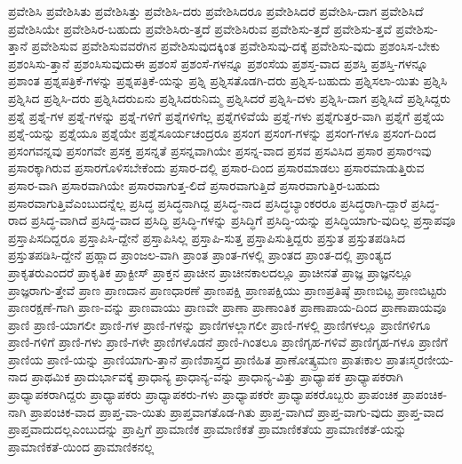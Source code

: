 {ಪ್ರವೇಶಿಸಿ
ಪ್ರವೇಶಿಸಿತು
ಪ್ರವೇಶಿಸಿತ್ತು
ಪ್ರವೇಶಿಸಿ-ದರು
ಪ್ರವೇಶಿಸಿದರೂ
ಪ್ರವೇಶಿಸಿದರೆ
ಪ್ರವೇಶಿಸಿ-ದಾಗ
ಪ್ರವೇಶಿಸಿದೆ
ಪ್ರವೇಶಿಸಿಯೇ
ಪ್ರವೇಶಿಸಿರ-ಬಹುದು
ಪ್ರವೇಶಿಸಿರು-ತ್ತದೆ
ಪ್ರವೇಶಿಸಿರುವ
ಪ್ರವೇಶಿಸು-ತ್ತದೆ
ಪ್ರವೇಶಿಸು-ತ್ತವೆ
ಪ್ರವೇಶಿಸು-ತ್ತಾನೆ
ಪ್ರವೇಶಿಸುವ
ಪ್ರವೇಶಿಸುವವರೆಗಿನ
ಪ್ರವೇಶಿಸುವುದಕ್ಕಿಂತ
ಪ್ರವೇಶಿಸುವು-ದಕ್ಕೆ
ಪ್ರವೇಶಿಸು-ವುದು
ಪ್ರಶಂಸಿಸ-ಬೇಕು
ಪ್ರಶಂಸಿಸು-ತ್ತಾನೆ
ಪ್ರಶಂಸಿಸುವುದುಈ
ಪ್ರಶಂಸೆ
ಪ್ರಶಂಸೆ-ಗಳನ್ನೂ
ಪ್ರಶಂಸೆಯ
ಪ್ರಶಸ್ತ-ವಾದ
ಪ್ರಶಸ್ತಿ
ಪ್ರಶಸ್ತಿ-ಗಳನ್ನೂ
ಪ್ರಶಾಂತ
ಪ್ರಶ್ನಪತ್ರಿಕೆ-ಗಳನ್ನು
ಪ್ರಶ್ನಪತ್ರಿಕೆ-ಯನ್ನು
ಪ್ರಶ್ನಿ
ಪ್ರಶ್ನಿಸತೊಡಗಿ-ದರು
ಪ್ರಶ್ನಿಸ-ಬಹುದು
ಪ್ರಶ್ನಿಸಲಾ-ಯಿತು
ಪ್ರಶ್ನಿಸಿ
ಪ್ರಶ್ನಿಸಿದ
ಪ್ರಶ್ನಿಸಿ-ದರು
ಪ್ರಶ್ನಿಸಿದರುಏನು
ಪ್ರಶ್ನಿಸಿದರುನಿಮ್ಮ
ಪ್ರಶ್ನಿಸಿದರೆ
ಪ್ರಶ್ನಿಸಿ-ದಳು
ಪ್ರಶ್ನಿಸಿ-ದಾಗ
ಪ್ರಶ್ನಿಸಿದೆ
ಪ್ರಶ್ನಿಸಿದ್ದರು
ಪ್ರಶ್ನೆ
ಪ್ರಶ್ನೆ-ಗಳ
ಪ್ರಶ್ನೆ-ಗಳನ್ನು
ಪ್ರಶ್ನೆ-ಗಳಿಗೆ
ಪ್ರಶ್ನೆಗಳಿಗೆಲ್ಲ
ಪ್ರಶ್ನೆಗಳಿವೆಯೆ
ಪ್ರಶ್ನೆ-ಗಳು
ಪ್ರಶ್ನೆಗುತ್ತರ-ವಾಗಿ
ಪ್ರಶ್ನೆಗೆ
ಪ್ರಶ್ನೆಯ
ಪ್ರಶ್ನೆ-ಯನ್ನು
ಪ್ರಶ್ನೆಯೂ
ಪ್ರಶ್ನೆಯೇ
ಪ್ರಶ್ನೆಸೂರ್ಯಚಂದ್ರರೂ
ಪ್ರಸಂಗ
ಪ್ರಸಂಗ-ಗಳನ್ನು
ಪ್ರಸಂಗ-ಗಳೂ
ಪ್ರಸಂಗ-ದಿಂದ
ಪ್ರಸಂಗವನ್ನವು
ಪ್ರಸಂಗವೇ
ಪ್ರಸಕ್ತ
ಪ್ರಸನ್ನತೆ
ಪ್ರಸನ್ನವಾಗಿಯೇ
ಪ್ರಸನ್ನ-ವಾದ
ಪ್ರಸವ
ಪ್ರಸವಿಸಿದ
ಪ್ರಸಾರ
ಪ್ರಸಾರಇವು
ಪ್ರಸಾರಕ್ಕಾಗಿರುವ
ಪ್ರಸಾರಗೊಳಿಸಬೇಕೆಂದು
ಪ್ರಸಾರ-ದಲ್ಲಿ
ಪ್ರಸಾರ-ದಿಂದ
ಪ್ರಸಾರಮಾಡಲು
ಪ್ರಸಾರಮಾಡುತ್ತಿರುವ
ಪ್ರಸಾರ-ವಾಗಿ
ಪ್ರಸಾರವಾಗಿಯೇ
ಪ್ರಸಾರವಾಗುತ್ತ-ಲಿದೆ
ಪ್ರಸಾರವಾಗುತ್ತಿದೆ
ಪ್ರಸಾರವಾಗುತ್ತಿರ-ಬಹುದು
ಪ್ರಸಾರವಾಗುತ್ತಿವೆಎಂಬುದನ್ನೆಲ್ಲ
ಪ್ರಸಿದ್ಧ
ಪ್ರಸಿದ್ಧನಾಗಿದ್ದ
ಪ್ರಸಿದ್ಧ-ನಾದ
ಪ್ರಸಿದ್ಧಬ್ಯಾಂಕರರೂ
ಪ್ರಸಿದ್ಧರಾಗಿ-ದ್ದಾರೆ
ಪ್ರಸಿದ್ಧ-ರಾದ
ಪ್ರಸಿದ್ಧ-ವಾಗಿದೆ
ಪ್ರಸಿದ್ಧ-ವಾದ
ಪ್ರಸಿದ್ಧಿ
ಪ್ರಸಿದ್ಧಿ-ಗಳನ್ನು
ಪ್ರಸಿದ್ಧಿಗೆ
ಪ್ರಸಿದ್ಧಿ-ಯನ್ನು
ಪ್ರಸಿದ್ಧಿಯಾಗು-ವುದಿಲ್ಲ
ಪ್ರಸ್ತಾಪವೂ
ಪ್ರಸ್ತಾಪಿಸದಿದ್ದರೂ
ಪ್ರಸ್ತಾಪಿಸಿ-ದ್ದೇನೆ
ಪ್ರಸ್ತಾಪಿಸಿಲ್ಲ
ಪ್ರಸ್ತಾಪಿ-ಸುತ್ತ
ಪ್ರಸ್ತಾಪಿಸುತ್ತಿದ್ದರು
ಪ್ರಸ್ತುತ
ಪ್ರಸ್ತುತಪಡಿಸಿದ
ಪ್ರಸ್ತುತಪಡಿಸಿ-ದ್ದೇನೆ
ಪ್ರಹ್ಲಾದ
ಪ್ರಾಂಜಲ-ವಾಗಿ
ಪ್ರಾಂತ
ಪ್ರಾಂತ-ಗಳಲ್ಲಿ
ಪ್ರಾಂತದ
ಪ್ರಾಂತ-ದಲ್ಲಿ
ಪ್ರಾಂತ್ಯದ
ಪ್ರಾಕೃತರುಎಂದರೆ
ಪ್ರಾಕೃತಿಕ
ಪ್ರಾಕ್ಟೀಸ್
ಪ್ರಾಕ್ತನ
ಪ್ರಾಚೀನ
ಪ್ರಾಚೀನಕಾಲದಲ್ಲೂ
ಪ್ರಾಚೀನತೆ
ಪ್ರಾಜ್ಞ
ಪ್ರಾಜ್ಞನಲ್ಲೂ
ಪ್ರಾಜ್ಞರಾಗು-ತ್ತೇವೆ
ಪ್ರಾಣ
ಪ್ರಾಣದಾನ
ಪ್ರಾಣಧಾರಣೆ
ಪ್ರಾಣಪಕ್ಷಿ
ಪ್ರಾಣಪಕ್ಷಿಯು
ಪ್ರಾಣಪ್ರತಿಷ್ಠೆ
ಪ್ರಾಣಬಿಟ್ಟ
ಪ್ರಾಣಬಿಟ್ಟರು
ಪ್ರಾಣರಕ್ಷಣೆ-ಗಾಗಿ
ಪ್ರಾಣ-ವನ್ನು
ಪ್ರಾಣವಾಯು
ಪ್ರಾಣವೇ
ಪ್ರಾಣಾ
ಪ್ರಾಣಾಂತಿಕ
ಪ್ರಾಣಾಪಾಯ-ದಿಂದ
ಪ್ರಾಣಾಪಾಯವೂ
ಪ್ರಾಣಿ
ಪ್ರಾಣಿ-ಯಾಗಲೀ
ಪ್ರಾಣಿ-ಗಳ
ಪ್ರಾಣಿ-ಗಳನ್ನು
ಪ್ರಾಣಿಗಳಲ್ಲಾಗಲೀ
ಪ್ರಾಣಿ-ಗಳಲ್ಲಿ
ಪ್ರಾಣಿಗಳಲ್ಲೂ
ಪ್ರಾಣಿಗಳಿಗೂ
ಪ್ರಾಣಿ-ಗಳಿಗೆ
ಪ್ರಾಣಿ-ಗಳು
ಪ್ರಾಣಿ-ಗಳೇ
ಪ್ರಾಣಿಗಳೊಡನೆ
ಪ್ರಾಣಿ-ಗಿಂತಲೂ
ಪ್ರಾಣಿಗೃಹ-ಗಳಿವೆ
ಪ್ರಾಣಿಗೃಹ-ಗಳೂ
ಪ್ರಾಣಿಗೆ
ಪ್ರಾಣಿಯ
ಪ್ರಾಣಿ-ಯನ್ನು
ಪ್ರಾಣಿಯಾಗು-ತ್ತಾನೆ
ಪ್ರಾಣಿಶಾಸ್ತ್ರದ
ಪ್ರಾಣಿಹಿತ
ಪ್ರಾಣೋತ್ಕ್ರಮಣ
ಪ್ರಾತಃಕಾಲ
ಪ್ರಾತಃಸ್ಮರಣೀಯ-ನಾದ
ಪ್ರಾಥಮಿಕ
ಪ್ರಾದುರ್ಭಾವಕ್ಕೆ
ಪ್ರಾಧಾನ್ಯ
ಪ್ರಾಧಾನ್ಯ-ವನ್ನು
ಪ್ರಾಧಾನ್ಯ-ವಿತ್ತು
ಪ್ರಾಧ್ಯಾಪಕ
ಪ್ರಾಧ್ಯಾಪಕರಾಗಿ
ಪ್ರಾಧ್ಯಾಪಕರಾಗಿದ್ದರು
ಪ್ರಾಧ್ಯಾಪಕರು
ಪ್ರಾಧ್ಯಾಪಕರು-ಗಳು
ಪ್ರಾಧ್ಯಾಪಕರೇ
ಪ್ರಾಧ್ಯಾಪಕರೊಬ್ಬರು
ಪ್ರಾಪಂಚಿಕ
ಪ್ರಾಪಂಚಿಕ-ನಾಗಿ
ಪ್ರಾಪಂಚಿಕ-ವಾದ
ಪ್ರಾಪ್ತ-ವಾ-ಯಿತು
ಪ್ರಾಪ್ತವಾಗತೊಡ-ಗಿತು
ಪ್ರಾಪ್ತ-ವಾಗಿದೆ
ಪ್ರಾಪ್ತ-ವಾಗು-ವುದು
ಪ್ರಾಪ್ತ-ವಾದ
ಪ್ರಾಪ್ತವಾದುದಲ್ಲಎಂಬುದನ್ನು
ಪ್ರಾಪ್ತಿಗೆ
ಪ್ರಾಮಾಣಿಕ
ಪ್ರಾಮಾಣಿಕತೆ
ಪ್ರಾಮಾಣಿಕತೆಯ
ಪ್ರಾಮಾಣಿಕತೆ-ಯನ್ನು
ಪ್ರಾಮಾಣಿಕತೆ-ಯಿಂದ
ಪ್ರಾಮಾಣಿಕನಲ್ಲ
}

